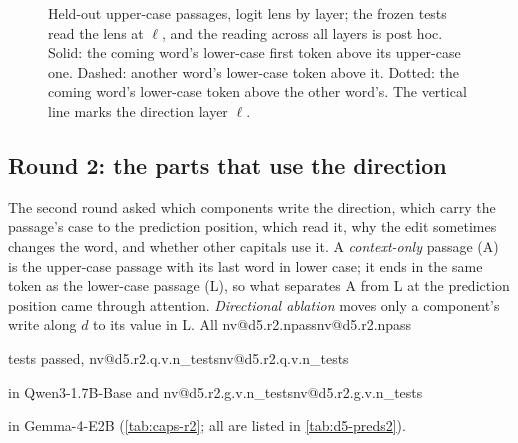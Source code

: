 \documentclass[11pt]{article}
\makeatletter
\newcommand{\nv}[1]{\ifcsname nv@#1\endcsname\csname nv@#1\endcsname\else\PackageError{numbers}{Unknown number key #1}{}\fi}
\newcommand{\qbig}{Qwen3-1.7B-Base}
\newcommand{\gm}{Gemma-4-E2B}
\makeatother
\begin{document}
\begin{figure}[t]
\centering
{}\hfill
{}
\caption{Held-out upper-case passages, logit lens by layer; the frozen tests read the lens at $\ell$, and the reading across all layers is post hoc. Solid: the coming word's lower-case first token above its upper-case one. Dashed: another word's lower-case token above it. Dotted: the coming word's lower-case token above the other word's. The vertical line marks the direction layer $\ell$.}
\label{fig:lens}
\end{figure}

\subsection{Round 2: the parts that use the direction}

The second round asked which components write the direction, which carry the passage's case to the prediction position, which read it, why the edit sometimes changes the word, and whether other capitals use it. A \emph{context-only} passage (A) is the upper-case passage with its last word in lower case; it ends in the same token as the lower-case passage (L), so what separates A from L at the prediction position came through attention. \emph{Directional ablation} moves only a component's write along $d$ to its value in L. All \nv{d5.r2.npass} tests passed, \nv{d5.r2.q.v.n_tests} in \qbig{} and \nv{d5.r2.g.v.n_tests} in \gm{} (\cref{tab:caps-r2}; all are listed in \cref{tab:d5-preds2}).
\end{document}
